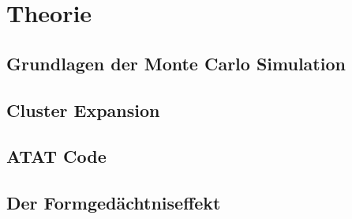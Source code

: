 \chapter{Theorie}
\section{Grundlagen der Monte Carlo Simulation}
\section{Cluster Expansion}
\section{ATAT Code}
\section{Der Formgedächtniseffekt}
